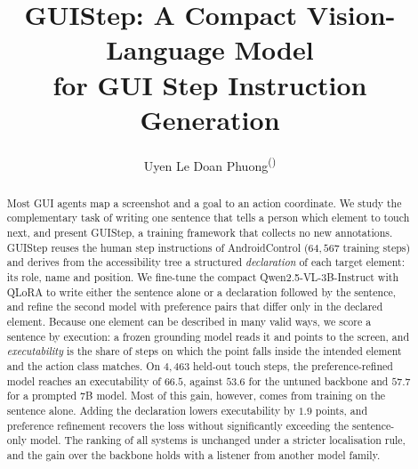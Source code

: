 \documentclass[runningheads,a4paper]{llncs}
\begin{document}
\title{GUIStep: A Compact Vision-Language Model\\
for GUI Step Instruction Generation}


\author{Uyen Le Doan Phuong\textsuperscript{(\Letter)}}



\maketitle

\begin{abstract}
Most GUI agents map a screenshot and a goal to an action coordinate. We study the complementary
task of writing one sentence that tells a person which element to touch next, and present GUIStep, a
training framework that collects no new annotations. GUIStep reuses the human step
instructions of AndroidControl ($64{,}567$ training steps) and derives from the accessibility tree a structured
\emph{declaration} of each target element: its role, name and position. We fine-tune the compact Qwen2.5-VL-3B-Instruct with QLoRA to write either
the sentence alone or a declaration followed by the sentence, and refine the second model with
preference pairs that differ only in the declared element. Because one element can be described in
many valid ways, we score a sentence by execution: a frozen grounding model reads it and points to
the screen, and \emph{executability} is the share of steps on which the point falls inside the intended
element and the action class matches. On $4{,}463$
held-out touch steps, the preference-refined model reaches an executability of $66.5$, against
$53.6$ for the untuned backbone and $57.7$ for a prompted 7B model. Most of this gain,
however, comes from training on the sentence alone. Adding the declaration lowers executability by
$1.9$ points, and preference refinement recovers the loss without significantly exceeding the
sentence-only model. The ranking of all systems is unchanged under a stricter localisation rule, and
the gain over the backbone holds with a listener from another model family.
\end{abstract}
\end{document}
